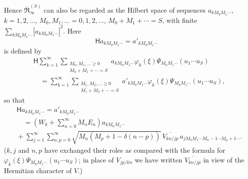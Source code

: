 \documentclass[fontsize=13pt,twoside,openany,headings=normal,parskip=false,bookmarkpackage=false,DIV=calc]{scrbook}
\begin{document}
Hence $\overline{\mathfrak R}_{\infty}^{(S)}$ can also be regarded as the Hilbert space of sequences $a_{kM_0M_1\cdots}$, $k=1,2,\ldots$, $M_0,M_1,\ldots=0,1,2,\ldots$, $M_0+M_1+\cdots=S$, with finite $\sum_{kM_0M_1\cdots}|a_{kM_0M_1\cdots}|^2$. Here
\[
 \mathsf{H}a_{kM_0M_1\cdots}=a'_{kM_0M_1\cdots}
\]
is defined by
\begin{align*}
 &\mathsf{H}\sum_{k=1}^{\infty}\sum_{\substack{M_0,M_1,\ldots\ge0\\M_0+M_1+\cdots=S}}
 a_{kM_0M_1\cdots}\varphi_k(\xi)\Psi_{M_0M_1\cdots}(u_1\cdots u_S)\\
 &\quad=\sum_{k=1}^{\infty}\sum_{\substack{M_1,M_2,\ldots\ge0\\M_1+M_2+\cdots=S}}
 a'_{kM_0M_1\cdots}\varphi_k(\xi)\Psi_{M_0M_1\cdots}(u_1\cdots u_S),
\end{align*}
so that
\begin{align*}
 &\mathsf{H}a_{kM_0M_1\cdots}=a'_{kM_0M_1\cdots}\\
 &\quad={}\left(W_k+\sum_{n=0}^{\infty}M_nE_n\right)a_{kM_0M_1\cdots}\\
 &{}+\sum_{j=1}^{\infty}\sum_{n,p=0}^{\infty}\sqrt{M_n(M_p+1-\delta(n-p))}\,
 \overline{V_{kn/jp}}\,a_{jM_0M_1\cdots M_n-1\cdots M_p+1\cdots}.
\end{align*}
($k,j$ and $n,p$ have exchanged their roles as compared with the formula for $\varphi_k(\xi)\Psi_{M_0M_1\cdots}(u_1\cdots u_S)$; in place of $V_{jp/kn}$ we have written $\overline{V_{kn/jp}}$ in view of the Hermitian character of $V$.)
\end{document}
